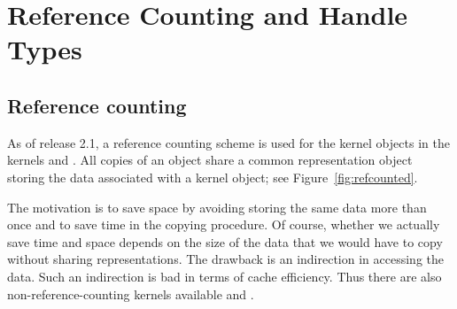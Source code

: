 
\chapter{Reference Counting and Handle Types}
\label{chap:reference_counting}


\section{Reference counting}
As of release 2.1, a reference counting%
 scheme is used for
the kernel objects in the kernels  and 
. 
All copies of an object share a common representation object storing
the data associated with a kernel object; see Figure~\ref{fig:refcounted}.

The motivation is to save space by avoiding storing the same data more 
than once and to save time in the copying procedure. 
Of course, whether we actually save time and space depends on the size 
of the data that we would have to copy without sharing representations.
The drawback is an indirection in accessing the data. Such an indirection is 
bad in terms of cache efficiency. 
Thus there are also non-reference-counting kernels available
 and .

